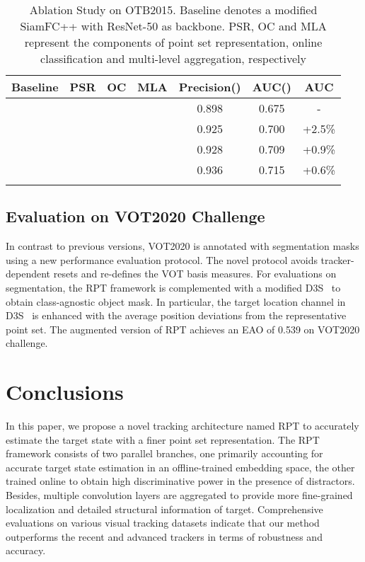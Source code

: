 \documentclass[runningheads]{llncs}
\begin{document}
\begin{table}
\begin{center}
\caption{Ablation Study on OTB2015. Baseline denotes a modified SiamFC++ with ResNet-50 as backbone. PSR, OC and MLA represent the components of point set representation, online classification and multi-level aggregation, respectively}
\label{table:ablation}
\begin{tabular}{@{}cccc|ccc@{}}
\hline
Baseline & PSR & OC & MLA & Precision() & AUC() & AUC\tabularnewline
\hline
  &  &  &  & 0.898 & 0.675 & - \tabularnewline
  &   &  &  & 0.925 & 0.700 & +2.5\% \tabularnewline
  &   &   &  & 0.928 & 0.709 & +0.9\% \tabularnewline
  &   &   &   & 0.936 & 0.715 & +0.6\% \tabularnewline
\hline\noalign{\smallskip}
\end{tabular}
\end{center}
\end{table}


\subsection{Evaluation on VOT2020 Challenge}\label{header-n52}

In contrast to previous versions, VOT2020 is annotated with segmentation
masks using a new performance evaluation protocol. The novel protocol
avoids tracker-dependent resets and re-defines the VOT basis measures.
For evaluations on segmentation, the RPT framework is complemented with
a modified D3S~\cite{D3S} to obtain class-agnostic object mask. In particular, the
target location channel in D3S~\cite{D3S} is enhanced with the average position
deviations from the representative point set. The augmented version of
RPT achieves an EAO of 0.539 on VOT2020 challenge.






\section{Conclusions}
In this paper, we propose a novel tracking architecture named RPT to accurately estimate the target state with a finer point set representation. The RPT framework consists of two parallel branches, one primarily accounting for accurate target state estimation in an offline-trained embedding space, the other trained online to obtain high discriminative power in the presence of distractors. Besides, multiple convolution layers are aggregated to provide more fine-grained localization and detailed structural information of target. Comprehensive evaluations on various visual tracking datasets indicate that our method outperforms the recent and advanced trackers in terms of robustness and accuracy.







\clearpage


\end{document}

